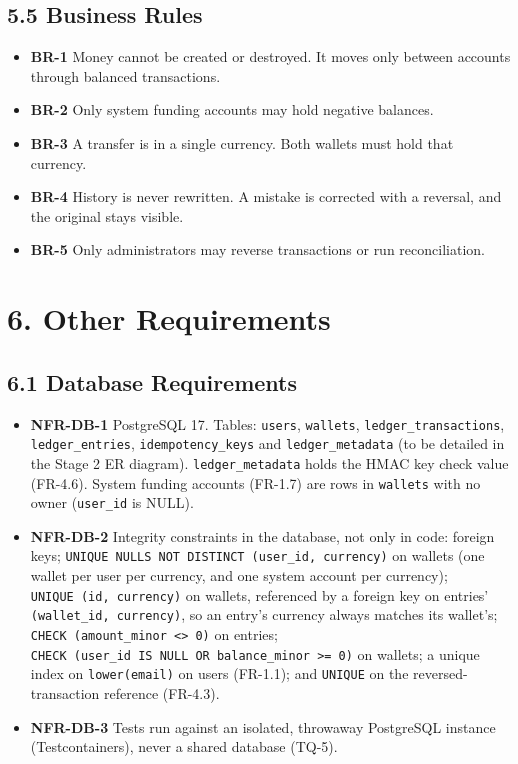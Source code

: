 \documentclass[11pt,a4paper]{article}
\providecommand{\tightlist}{\setlength{\itemsep}{2pt}\setlength{\parskip}{0pt}}
\begin{document}
\subsection{5.5 Business Rules}\label{business-rules}

\begin{itemize}
\tightlist
\item
  \textbf{BR-1} Money cannot be created or destroyed. It moves only between accounts through balanced
  transactions.
\item
  \textbf{BR-2} Only system funding accounts may hold negative balances.
\item
  \textbf{BR-3} A transfer is in a single currency. Both wallets must hold that currency.
\item
  \textbf{BR-4} History is never rewritten. A mistake is corrected with a reversal, and the original
  stays visible.
\item
  \textbf{BR-5} Only administrators may reverse transactions or run reconciliation.
\end{itemize}

\section{6. Other Requirements}\label{other-requirements}

\subsection{6.1 Database Requirements}\label{database-requirements}

\begin{itemize}
\tightlist
\item
  \textbf{NFR-DB-1} PostgreSQL 17. Tables: \texttt{users}, \texttt{wallets}, \texttt{ledger\_\allowbreak{}transactions}, \texttt{ledger\_\allowbreak{}entries},
  \texttt{idempotency\_\allowbreak{}keys} and \texttt{ledger\_\allowbreak{}metadata} (to be detailed in the Stage 2 ER diagram).
  \texttt{ledger\_\allowbreak{}metadata} holds the HMAC key check value (FR-4.6). System funding accounts (FR-1.7) are
  rows in \texttt{wallets} with no owner (\texttt{user\_\allowbreak{}id} is NULL).
\item
  \textbf{NFR-DB-2} Integrity constraints in the database, not only in code: foreign keys; \texttt{UNIQUE\ NULLS\ NOT\ DISTINCT\ (user\_\allowbreak{}id,\ currency)} on wallets (one wallet per user per currency, and one system
  account per currency); \texttt{UNIQUE\ (id,\ currency)} on wallets, referenced by a foreign key on
  entries' \texttt{(wallet\_\allowbreak{}id,\ currency)}, so an entry's currency always matches its wallet's; \texttt{CHECK\ (amount\_\allowbreak{}minor\ \textless{}\textgreater{}\ 0)} on entries; \texttt{CHECK\ (user\_\allowbreak{}id\ IS\ NULL\ OR\ balance\_\allowbreak{}minor\ \textgreater{}=\ 0)} on wallets; a
  unique index on \texttt{lower(email)} on users (FR-1.1); and \texttt{UNIQUE} on the reversed-transaction
  reference (FR-4.3).
\item
  \textbf{NFR-DB-3} Tests run against an isolated, throwaway PostgreSQL instance (Testcontainers),
  never a shared database (TQ-5).
\end{itemize}
\end{document}
